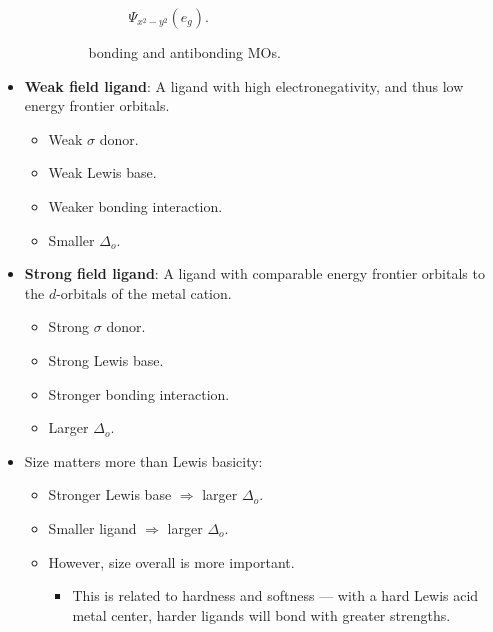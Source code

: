 \documentclass[../notes.tex]{subfiles}
\begin{document}
\begin{itemize}
\begin{itemize}
\begin{figure}[h!]
\begin{subfigure}[b]{0.19\linewidth}
                \caption{$\Psi_{x^2-y^2}(e_g)$.}
                \label{fig:SALCs-MH6f}
            \end{subfigure}
            \caption{ bonding and antibonding MOs.}
            \label{fig:SALCs-MH6}
        \end{figure}
    \end{itemize}
    \item \textbf{Weak field ligand}: A ligand with high electronegativity, and thus low energy frontier orbitals.
    \begin{itemize}
        \item Weak $\sigma$ donor.
        \item Weak Lewis base.
        \item Weaker bonding interaction.
        \item Smaller $\Delta_o$.
    \end{itemize}
    \item \textbf{Strong field ligand}: A ligand with comparable energy frontier orbitals to the $d$-orbitals of the metal cation.
    \begin{itemize}
        \item Strong $\sigma$ donor.
        \item Strong Lewis base.
        \item Stronger bonding interaction.
        \item Larger $\Delta_o$.
    \end{itemize}
    \item Size matters more than Lewis basicity:
    \begin{itemize}
        \item Stronger Lewis base $\Rightarrow$ larger $\Delta_o$.
        \item Smaller ligand $\Rightarrow$ larger $\Delta_o$.
        \item However, size overall is more important.
        \begin{itemize}
            \item This is related to hardness and softness --- with a hard Lewis acid metal center, harder ligands will bond with greater strengths.

\end{itemize}
\end{itemize}
\end{itemize}
\end{document}
